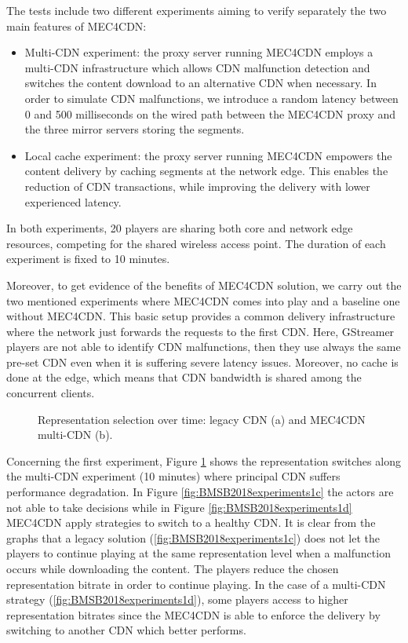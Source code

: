 The tests include two different experiments aiming to verify separately the two main features of MEC4CDN:
\begin{itemize}  
	\item Multi-CDN experiment: the proxy server running MEC4CDN employs a multi-CDN infrastructure which allows CDN malfunction detection and switches the content download to an alternative CDN when necessary. In order to simulate CDN malfunctions, we introduce a random latency between 0 and 500 milliseconds on the wired path between the MEC4CDN proxy and the three mirror servers storing the segments.
	\item Local cache experiment: the proxy server running MEC4CDN empowers the content delivery by caching segments at the network edge. This enables the reduction of CDN transactions, while improving the delivery with lower experienced latency.
\end{itemize}

In both experiments, 20 players are sharing both core and network edge resources, competing for the shared wireless access point. The duration of each experiment is fixed to 10 minutes.

Moreover, to get evidence of the benefits of MEC4CDN solution, we carry out the two mentioned experiments where MEC4CDN comes into play and a baseline one without MEC4CDN. This basic setup provides a common delivery infrastructure where the network just forwards the requests to the first CDN. Here, GStreamer players are not able to identify CDN malfunctions, then they use always the same pre-set CDN even when it is suffering severe latency issues. Moreover, no cache is done at the edge, which means that CDN bandwidth is shared among the concurrent clients.


\begin{figure}[htp]
	\centering
	\hfil
	\hfil
	\caption{Representation selection over time: legacy CDN (a) and MEC4CDN multi-CDN (b).}
	\label{fig:BMSB2018experiments1}
\end{figure}

Concerning the first experiment, Figure \ref{fig:BMSB2018experiments1} shows the representation switches along the multi-CDN experiment (10 minutes) where principal CDN suffers performance degradation. In Figure \ref{fig:BMSB2018experiments1c} the actors are not able to take decisions while in Figure \ref{fig:BMSB2018experiments1d} MEC4CDN apply strategies to switch to a healthy CDN. It is clear from the graphs that a legacy solution (\ref{fig:BMSB2018experiments1c}) does not let the players to continue playing at the same representation level when a malfunction occurs while downloading the content. The players reduce the chosen representation bitrate in order to continue playing. In the case of a multi-CDN strategy (\ref{fig:BMSB2018experiments1d}), some players access to higher representation bitrates since the MEC4CDN is able to enforce the delivery by switching to another CDN which better performs.

